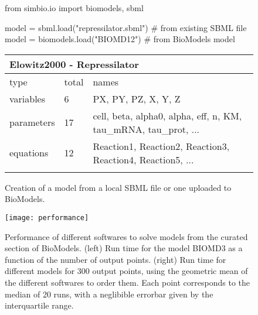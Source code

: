 \documentclass[namedate,numsec,webpdf,modern,large]{oup-authoring-template}
\theoremstyle{thmstyleone}%
\theoremstyle{thmstyletwo}%
\theoremstyle{thmstylethree}%
\newenvironment{CodeInput}{\begin{tcolorbox}[title=input,boxrule=0pt]}{\end{tcolorbox}}
\newenvironment{CodeOutput}{\begin{tcolorbox}[title=output,boxrule=0pt]}{\end{tcolorbox}}
\newcommand{\KeywordTok}[1]{\textcolor[rgb]{0.00,0.13,1.00}{#1}}
\newcommand{\ClassTok}[1]{\textcolor[rgb]{0.27,0.56,0.65}{#1}}
\newcommand{\OperatorTok}[1]{\textcolor[rgb]{0.00,0.00,0.00}{#1}}
\newcommand{\VariableTok}[1]{\textcolor[rgb]{0.00,0.06,0.50}{#1}}
\newcommand{\FunctionTok}[1]{\textcolor[rgb]{0.47,0.37,0.15}{#1}}
\newcommand{\CommentTok}[1]{\textcolor[rgb]{0.00,0.50,0.00}{#1}}
\newcommand{\StringTok}[1]{\textcolor[rgb]{0.70,0.27,0.27}{#1}}
\begin{document}
\begin{figure*}[t]
  \centering
  
  \begin{CodeInput}
  \begin{Highlighting}[]
  \KeywordTok{from}\ClassTok{ simbio.io }\KeywordTok{import}\ClassTok{ biomodels, sbml}

  \VariableTok{model }\OperatorTok{=}\ClassTok{ sbml}.\FunctionTok{load}\KeywordTok{(}\StringTok{"repressilator.sbml"}\KeywordTok{)}  \CommentTok{\# from existing SBML file}
  \VariableTok{model }\OperatorTok{=}\ClassTok{ biomodels}.\FunctionTok{load}\KeywordTok{(}\StringTok{"BIOMD12"}\KeywordTok{)}  \CommentTok{\# from BioModels}
  \VariableTok{model}
  \end{Highlighting}
  \end{CodeInput}
    
  \begin{CodeOutput}
      \begin{tabular}{@{}lll@{}}
          \multicolumn{3}{l}{Elowitz2000 - Repressilator} \\
          \toprule
          type & total & names \\
          \midrule
          variables  &  6 & PX, PY, PZ, X, Y, Z \\
          parameters & 17 & cell, beta, alpha0, alpha, eff, n, KM, tau\_mRNA, tau\_prot, ... \\
          equations  & 12 & Reaction1, Reaction2, Reaction3, Reaction4, Reaction5, ... \\
          \botrule
      \end{tabular}
  \end{CodeOutput}
  
  \caption{Creation of a model from a local SBML file or one uploaded to BioModels.}
  \label{fig-simbio-io}
\end{figure*}
  
\begin{figure*}[t]
  \centering
  \texttt{[image: performance]}
  \caption{
    Performance of different softwares to solve models from the curated section of BioModels.
    (left) Run time for the model BIOMD3 as a function of the number of output points.
    (right) Run time for different models for 300 output points,
    using the geometric mean of the different softwares to order them.
    Each point corresponds to the median of 20 runs,
    with a neglibible errorbar given by the interquartile range.
  }
  \label{fig-runtime}
\end{figure*}
\end{document}
